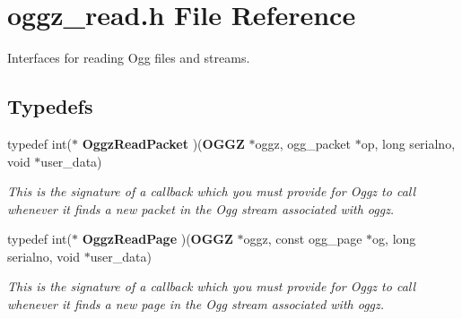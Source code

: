 \section{oggz\_\-read.h File Reference}
\label{oggz__read_8h}


Interfaces for reading Ogg files and streams.  


\subsection*{Typedefs}
\begin{DoxyCompactItemize}
\item 
typedef int($\ast$ {\bf OggzReadPacket} )({\bf OGGZ} $\ast$oggz, ogg\_\-packet $\ast$op, long serialno, void $\ast$user\_\-data)
\begin{DoxyCompactList}\small\item\em This is the signature of a callback which you must provide for Oggz to call whenever it finds a new packet in the Ogg stream associated with {\itshape oggz\/}. \item\end{DoxyCompactList}\item 
typedef int($\ast$ {\bf OggzReadPage} )({\bf OGGZ} $\ast$oggz, const ogg\_\-page $\ast$og, long serialno, void $\ast$user\_\-data)
\begin{DoxyCompactList}\small\item\em This is the signature of a callback which you must provide for Oggz to call whenever it finds a new page in the Ogg stream associated with {\itshape oggz\/}. \item\end{DoxyCompactList}\end{DoxyCompactItemize}
